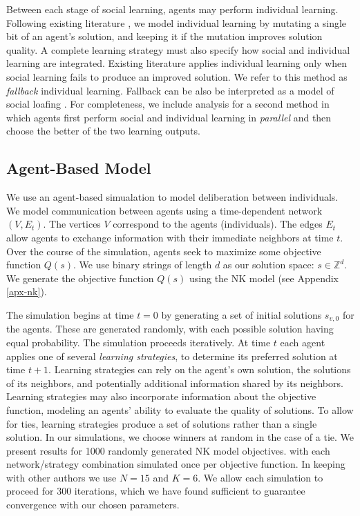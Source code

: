 Between each stage of social learning, agents may perform individual learning. Following existing literature \cite{lazer_network_2007, barkoczi_social_2016}, we model individual learning by mutating a single bit of an agent's solution, and keeping it if the mutation improves solution quality.
A complete learning strategy must also specify how social and individual learning are integrated. Existing literature \cite{lazer_network_2007, barkoczi_social_2016} applies individual learning only when social learning fails to produce an improved solution. We refer to this method as {\em fallback} individual learning. Fallback can be also be interpreted as a model of social loafing \cite{karau_social_1993}. For completeness, we include analysis for a second method in which agents first perform social and individual learning in {\em parallel} and then choose the better of the two learning outputs.

\subsection{Agent-Based Model}

We use an agent-based simualation to model deliberation between individuals.
We model communication between agents using a time-dependent network $(V,E_t)$.
The vertices $V$ correspond to the agents (individuals).
The edges $E_t$ allow agents to exchange information with their immediate neighbors at time $t$.
Over the course of the simulation, agents seek to maximize some objective function $Q(s)$.
We use binary strings of length $d$ as our solution space: $s \in \mathbb{Z}^d$.
We generate the objective function $Q(s)$ using the NK model \cite{kauffman_towards_1987, weinberger_local_1991} (see Appendix \ref{apx-nk}).

The simulation begins at time $t=0$ by generating a set of initial solutions $s_{v,0}$ for the agents.
These are generated randomly, with each possible solution having equal probability.
The simulation proceeds iteratively.
At time $t$ each agent applies one of several {\em learning strategies}, to determine its preferred solution at time $t+1$.
Learning strategies can rely on the agent's own solution, the solutions of its neighbors, and potentially additional information shared by its neighbors.
Learning strategies may also incorporate information about the objective function, modeling an agents' ability to evaluate the quality of solutions.
To allow for ties, learning strategies produce a set of solutions rather than a single solution.
In our simulations, we choose winners at random in the case of a tie.
We present results for 1000 randomly generated NK model objectives.
with each network/strategy combination simulated once per objective function.
In keeping with other authors \cite{barkoczi_social_2016, lazer_network_2007} we use $N=15$ and $K=6$.
We allow each simulation to proceed for 300 iterations, which we have found sufficient to guarantee convergence with our chosen parameters.

